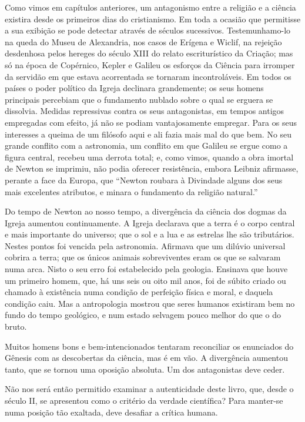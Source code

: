 \documentclass[11pt,a5paper,twoside,openany]{book}
\begin{document}
Como vimos em capítulos anteriores, um antagonismo entre a religião e a ciência existira desde os primeiros dias do cristianismo. Em toda a ocasião que permitisse a sua exibição se pode detectar através de séculos sucessivos. Testemunhamo-lo na queda do Museu de Alexandria, nos casos de Erígena e Wiclif, na rejeição desdenhosa pelos hereges do século XIII do relato escriturístico da Criação; mas só na época de Copérnico, Kepler e Galileu os esforços da Ciência para irromper da servidão em que estava acorrentada se tornaram incontroláveis. Em todos os países o poder político da Igreja declinara grandemente; os seus homens principais percebiam que o fundamento nublado sobre o qual se erguera se dissolvia. Medidas repressivas contra os seus antagonistas, em tempos antigos empregadas com efeito, já não se podiam vantajosamente empregar. Para os seus interesses a queima de um filósofo aqui e ali fazia mais mal do que bem. No seu grande conflito com a astronomia, um conflito em que Galileu se ergue como a figura central, recebeu uma derrota total; e, como vimos, quando a obra imortal de Newton se imprimiu, não podia oferecer resistência, embora Leibniz afirmasse, perante a face da Europa, que “Newton roubara à Divindade alguns dos seus mais excelentes atributos, e minara o fundamento da religião natural.”

Do tempo de Newton ao nosso tempo, a divergência da ciência dos dogmas da Igreja aumentou continuamente. A Igreja declarava que a terra é o corpo central e mais importante do universo; que o sol e a lua e as estrelas lhe são tributários. Nestes pontos foi vencida pela astronomia. Afirmava que um dilúvio universal cobrira a terra; que os únicos animais sobreviventes eram os que se salvaram numa arca. Nisto o seu erro foi estabelecido pela geologia. Ensinava que houve um primeiro homem, que, há uns seis ou oito mil anos, foi de súbito criado ou chamado à existência numa condição de perfeição física e moral, e daquela condição caiu. Mas a antropologia mostrou que seres humanos existiram bem no fundo do tempo geológico, e num estado selvagem pouco melhor do que o do bruto.

Muitos homens bons e bem-intencionados tentaram reconciliar os enunciados do Gênesis com as descobertas da ciência, mas é em vão. A divergência aumentou tanto, que se tornou uma oposição absoluta. Um dos antagonistas deve ceder.

Não nos será então permitido examinar a autenticidade deste livro, que, desde o século II, se apresentou como o critério da verdade científica? Para manter-se numa posição tão exaltada, deve desafiar a crítica humana.
\end{document}
